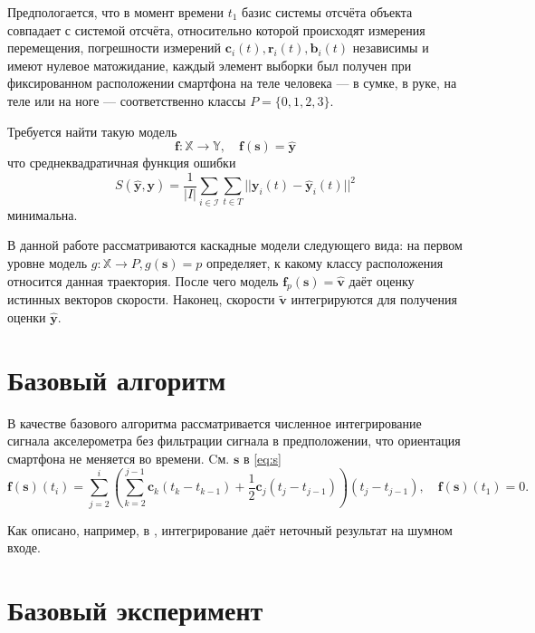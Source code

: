\documentclass[12pt,twoside]{article}
\begin{document}
Предпологается, что 
в момент времени $t_1$ базис системы отсчёта объекта совпадает с системой отсчёта, относительно которой происходят измерения перемещения, 
погрешности измерений $\mathbf{c}_i(t), \mathbf{r}_i(t), \mathbf{b}_i(t)$ независимы и имеют нулевое матожидание, 
 каждый элемент выборки был получен при фиксированном расположении смартфона на теле человека --- в сумке, в руке, на теле или на ноге 
    --- соответственно классы $ P = \{0, 1, 2, 3 \} $.


Требуется найти такую модель 
$$ 
\mathbf{f}: \mathbb{X} \rightarrow \mathbb{Y}, \quad \mathbf{f}(\mathbf{s}) = \hat{\mathbf{y}} 
$$
что среднеквадратичная функция ошибки 
$$
    S(\hat{\mathbf{y}}, \mathbf{y}) = \frac{1}{|I|} \sum\limits_{i \in \mathcal{I}}
     \sum\limits_{t \in T} || \mathbf{y}_i(t) - \hat{\mathbf{y}}_i(t) ||^2
$$ 
минимальна.

В данной работе рассматриваются каскадные модели следующего вида:
на первом уровне 
модель $g: \mathbb{X} \rightarrow P, g(\mathbf{s}) = p$ определяет, к какому классу расположения относится данная траектория. После чего
модель $\mathbf{f}_p(\mathbf{s}) = \hat{\mathbf{v}} $ даёт оценку истинных векторов скорости. Наконец, скорости $\tilde{\mathbf{v}}$ интегрируются для получения оценки $\hat{\mathbf{y}}$.


\section{Базовый алгоритм}

В качестве базового алгоритма рассматривается численное интегрирование сигнала акселерометра 
без фильтрации сигнала в предположении, что ориентация смартфона не меняется во времени. Cм. $\mathbf{s}$ в  \eqref{eq:s} 
$$
    \mathbf{f}(\mathbf{s})(t_i) = \sum\limits_{j=2}^{i} \left(
    \sum\limits_{k=2}^{j - 1} \mathbf{c}_k (t_k - t_{k - 1}) + \frac{1}{2}\mathbf{c}_j (t_j - t_{j - 1})
    \right) (t_j - t_{j - 1}), \quad \mathbf{f}(\mathbf{s})(t_1) = 0.
$$

Как описано, например, в \cite{journals/corr/abs-1712-09004}, интегрирование даёт неточный результат на шумном входе.

\section{Базовый эксперимент}
\end{document}
